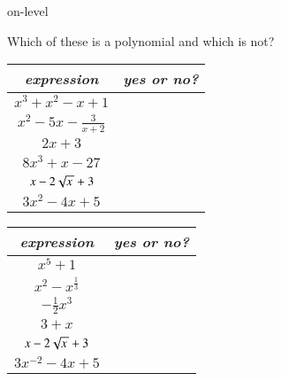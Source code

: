 \begin{taggedblock}{on-level}
\begin{myProblemsWithContent}{2}{Which of these is a polynomial and which is not?}
    \begin{tcolorbox}
        \begin{center}
            \large
            \renewcommand{\arraystretch}{1.2}
            \begin{tabular}{c||c}
                {\bfseries\itshape expression} & {\bfseries\itshape yes or no?} \\
                \midrule
                $x^3 + x^2 - x + 1$          & \hspace{2em} \\ \midrule
                $x^2 - 5x - {\frac{3}{x+2}}$ & \hspace{2em} \\ \midrule
                $2x + 3$                     & \hspace{2em} \\ \midrule
                $8x^3 + x - 27$              & \hspace{2em} \\ \midrule
                    $x - 2\myRoot{x} + 3$    & \hspace{2em} \\ \midrule
                $3x^2 - 4x + 5$              & \hspace{2em} \\ 
            \end{tabular}
        \end{center}
    \end{tcolorbox}
    \begin{tcolorbox}
        \begin{center}
            \large
            \renewcommand{\arraystretch}{1.2}
            \begin{tabular}{c||c}
                {\bfseries\itshape expression} & {\bfseries\itshape yes or no?} \\
                \midrule
                $x^5 + 1$                & \hspace{2em} \\ \midrule
                $x^2  - x^{\frac{1}{3}}$ & \hspace{2em} \\ \midrule
                $- \frac{1}{2}x^3$       & \hspace{2em} \\ \midrule
                $3 + x$                  & \hspace{2em} \\ \midrule
                $x - 2\myRoot{x} + 3$    & \hspace{2em} \\ \midrule
                $3x^{-2} - 4x + 5$       & \hspace{2em} \\ 
            \end{tabular}
        \end{center}
    \end{tcolorbox}
\end{myProblemsWithContent}


\end{taggedblock}